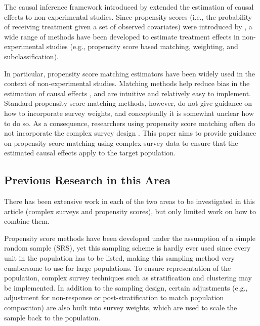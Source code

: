 \documentclass[oupdraft]{bio}
\begin{document}
The causal inference framework introduced by \citet{rubin1974estimating} extended the estimation of causal effects to non-experimental studies.  Since propensity scores (i.e.,  the probability of receiving treatment given a set of observed covariates) were introduced by \citet{rosenbaum1983central}, a wide range of methods have been developed to estimate treatment effects in non-experimental studies (e.g., propensity score based matching, weighting, and subclassification).

In particular, propensity score matching estimators have been widely used in the context of non-experimental studies. Matching methods help reduce bias in the estimation of causal effects \citep{rubin1973matching}, and are intuitive and relatively easy to implement. Standard propensity score matching methods, however, do not give guidance on how to incorporate survey weights, and conceptually it is somewhat unclear how to do so. As a consequence, researchers using propensity score matching often do not incorporate the complex survey design \citep[e.g.,][]{morgan2008propensity}. This paper aims to provide guidance on propensity score matching using complex survey data to ensure that the estimated causal effects apply to the target population.

\subsection{Previous Research in this Area} 
\label{S1.2}
There has been extensive work in each of the two areas to be investigated in this article (complex surveys and propensity scores), but only limited work on how to combine them.

Propensity score methods have been developed under the assumption of a simple random sample (SRS), yet this sampling scheme is hardly ever used since every unit in the population has to be listed, making  this sampling method very cumbersome to use for large populations. To ensure representation of the population, complex survey techniques such as stratification and clustering may be implemented. In addition to the sampling design, certain adjustments (e.g., adjustment for non-response or post-stratification to match population composition) are also built into survey weights, which are used to scale the sample back to the population.  
\end{document}

